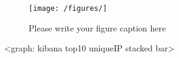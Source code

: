 \begin{figure}[h]
\centering
\texttt{[image: /figures/]}
\caption{Please write your figure caption here}
\label{fig-1}       %
\end{figure}
<graph: kibana top10 uniqueIP stacked bar> %

